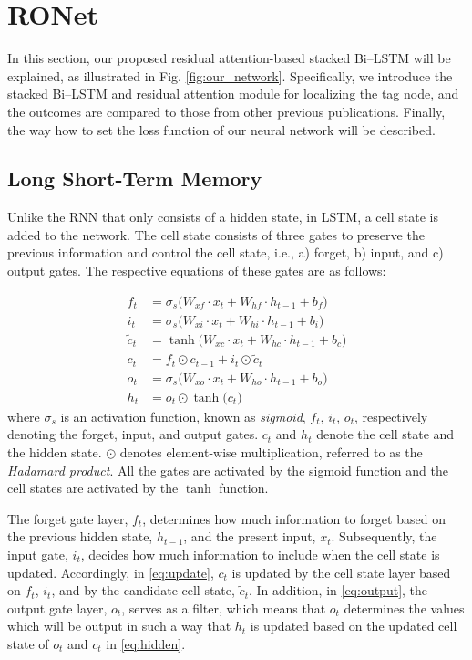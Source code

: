 \documentclass[letterpaper, 10 pt, conference]{ieeeconf}
\begin{document}
\section{RONet}

In this section, our proposed residual attention-based stacked Bi--LSTM will be explained, as illustrated in Fig. \ref{fig:our_network}. 
Specifically, we introduce the stacked Bi--LSTM and residual attention module for localizing the tag node, and the outcomes are compared to those from other previous publications. Finally, the way how to set the loss function of our neural network will be described. 

\subsection{Long Short-Term Memory}

Unlike the RNN that only consists of a hidden state, in LSTM, a cell state is added to the network\cite{hochreiter1997long}. The cell state consists of three gates to preserve the previous information and control the cell state, i.e., a) forget, b) input, and c) output gates. The respective equations of these gates are as follows:

\begin{align}
f_{t} & =\sigma _{s}\big(W_{xf}\cdot x_{t}+W_{hf}\cdot h_{t-1}+b_{f}\big)\label{eq:forget}\\
i_{t} & =\sigma _{s}\big(W_{xi}\cdot x_{t}+W_{hi}\cdot h_{t-1}+b_{i}\big)\label{eq:input}\\
\tilde{c}_{t} & = \tanh\big(W_{xc}\cdot x_{t}+W_{hc}\cdot h_{t-1}+b_{c}\big)\label{eq:new_cell}\\
c_{t} & =f_{t}\odot c_{t-1}+i_{t}\odot\tilde{c}_{t}\label{eq:update}\\
o_{t} & =\sigma _{s}\big(W_{xo}\cdot x_{t}+W_{ho}\cdot h_{t-1}+b_{o}\big)\label{eq:output}\\
h_{t} & =o_{t}\odot \tanh\big(c_{t}\big)\label{eq:hidden}
\end{align}
where $\sigma _{s}$ is an activation function, known as \textit{sigmoid}, $f_{t}$, $i_{t}$, $o_{t}$, respectively denoting the forget, input, and output gates. $c_{t}$ and $h_{t}$ denote the cell state and the hidden state. $\odot$ denotes element-wise multiplication, referred to as the \textit{Hadamard product}. All the gates are activated by the sigmoid function and the cell states are activated by the $\tanh$ function.

The forget gate layer, $f_{t}$, determines how much information to forget based on the previous hidden state, $h_{t-1}$, and the present input, $x_{t}$. Subsequently, the input gate, $i_{t}$, decides how much information to include when the cell state is updated. Accordingly, in \eqref{eq:update}, $c_{t}$ is updated by the cell state layer based on $f_{t}$, $i_{t}$, and by the candidate cell state, $\tilde{c}_{t}$. In addition, in \eqref{eq:output}, the output gate layer, $o_{t}$, serves as a filter, which means that $o_{t}$ determines the values which will be output in such a way that $h_{t}$ is updated based on the updated cell state of $o_{t}$ and $c_{t}$ in \eqref{eq:hidden}. 
\end{document}
